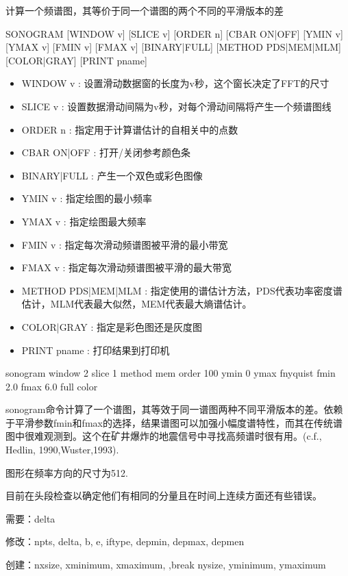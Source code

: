 \label{cmd:sonogram}

计算一个频谱图，其等价于同一个谱图的两个不同的平滑版本的差

\begin{SACSTX}
SONOGRAM [WINDOW v] [SLICE v] [ORDER n] [CBAR ON|OFF] 
    [YMIN v] [YMAX v] [FMIN v] [FMAX v] [BINARY|FULL] 
    [METHOD PDS|MEM|MLM] [COLOR|GRAY] [PRINT pname]
\end{SACSTX}

\begin{itemize}
\item WINDOW v : 设置滑动数据窗的长度为v秒，这个窗长决定了FFT的尺寸 
\item SLICE v : 设置数据滑动间隔为v秒，对每个滑动间隔将产生一个频谱图线 
\item ORDER n : 指定用于计算谱估计的自相关中的点数 
\item CBAR {ON|OFF} : 打开/关闭参考颜色条 
\item BINARY|FULL : 产生一个双色或彩色图像 
\item YMIN v : 指定绘图的最小频率  
\item YMAX v : 指定绘图最大频率 
\item FMIN v : 指定每次滑动频谱图被平滑的最小带宽 
\item FMAX v : 指定每次滑动频谱图被平滑的最大带宽  
\item METHOD {PDS|MEM|MLM} : 指定使用的谱估计方法，PDS代表功率密度谱估计，MLM代表最大似然，MEM代表最大熵谱估计。 
\item COLOR|GRAY : 指定是彩色图还是灰度图 
\item PRINT pname : 打印结果到打印机 
\end{itemize}
 
\begin{SACDFT}
sonogram window 2 slice 1 method mem order 100 ymin 0 ymax 	
    fnyquist fmin 2.0 fmax 6.0 full color
\end{SACDFT}

sonogram命令计算了一个谱图，其等效于同一谱图两种不同平滑版本的差。依赖于平滑参数fmin和fmax的选择，结果谱图可以加强小幅度谱特性，而其在传统谱图中很难观测到。这个在矿井爆炸的地震信号中寻找高频谱时很有用。(c.f., Hedlin, 1990,Wuster,1993).

图形在频率方向的尺寸为512.

目前在头段检查以确定他们有相同的分量且在时间上连续方面还有些错误。

需要：delta

修改：npts, delta, b, e, iftype, depmin, depmax, depmen

创建：nxsize, xminimum, xmaximum, ,break nysize, yminimum, ymaximum
